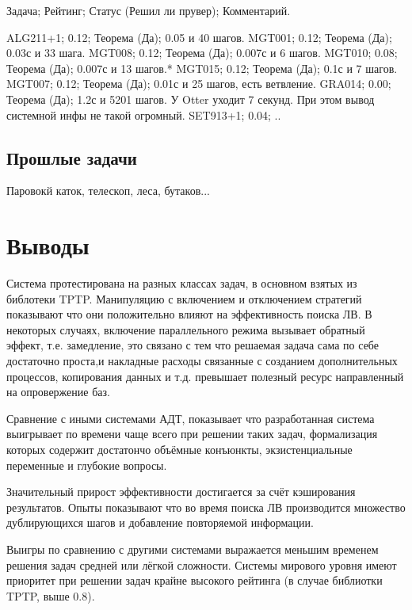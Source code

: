 Задача; Рейтинг; Статус (Решил ли прувер); Комментарий.

ALG211+1; 0.12; Теорема (Да); 0.05 и 40 шагов.
MGT001; 0.12; Теорема (Да); 0.03с и 33 шага.
MGT008; 0.12; Теорема (Да); 0.007с и 6 шагов.
MGT010; 0.08; Теорема (Да); 0.007с и 13 шагов.*
MGT015; 0.12; Теорема (Да); 0.1с и 7 шагов.
MGT007; 0.12; Теорема (Да); 0.01с и 25 шагов, есть ветвление.
GRA014; 0.00; Теорема (Да); 1.2с и 5201 шагов. У Otter уходит 7 секунд. При этом вывод системной инфы не такой огромный.
SET913+1; 0.04; ..

\subsection{Прошлые задачи}

Паровокй каток, телескоп, леса, бутаков...

\section{Выводы}
Система протестирована на разных классах задач, в основном взятых из библотеки TPTP. Манипуляцию с включением и отключением стратегий показывают что они положительно влияют на эффективность поиска ЛВ. В некоторых случаях, включение параллельного режима вызывает обратный эффект, т.е. замедление, это связано с тем что решаемая задача сама по себе достаточно проста,и  накладные расходы связанные с созданием дополнительных процессов, копирования данных и т.д. превышает полезный ресурс направленный на опровержение баз. 

Сравнение с иными системами АДТ, показывает что разработанная система выигрывает по времени чаще всего при решении таких задач, формализация которых содержит достатончо объёмные конъюнкты, экзистенциальные переменные и глубокие вопросы. 

Значительный прирост эффективности достигается за счёт кэширования результатов. Опыты показывают что во время поиска ЛВ производится множество дублирующихся шагов и добавление повторяемой информации.

Выигры по сравнению с другими системами выражается меньшим временем решения задач средней или лёгкой сложности. Системы мирового уровня имеют приоритет при решении задач крайне высокого рейтинга (в случае библиотки TPTP, выше 0.8).  



